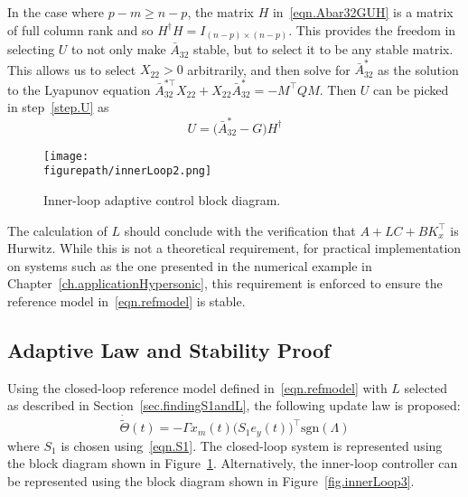 \begin{rem-dan}\label{rem.pmgeqnp}
  In the case where $p-m\geq n-p$, the matrix $H$ in\ \eqref{eqn.Abar32GUH} is a matrix of full column rank and so $H^{\dagger}H=I_{(n-p)\times(n-p)}$.
  This provides the freedom in selecting $U$ to not only make $\bar{A}_{32}$ stable, but to select it to be any stable matrix.
  This allows us to select $X_{22}>0$ arbitrarily, and then solve for $\bar{A}_{32}^{*}$ as the solution to the Lyapunov equation $\bar{A}_{32}^{*\top}X_{22}+X_{22}\bar{A}_{32}^{*}=-M^{\top}QM$.
  Then $U$ can be picked in step~\ref{step.U} as
  \begin{equation}
    \label{eqn.Uremark}
    U=\bigr(\bar{A}_{32}^{*}-G\bigr)H^{\dagger}
  \end{equation}
\end{rem-dan}

\begin{figure}[H]
  \begin{center}
    \texttt{[image: \\figurepath/innerLoop2.png]}
    \vspace{-0.1in}
    \caption{Inner-loop adaptive control block diagram.\label{fig.innerLoop2}}
  \end{center}
\end{figure}

\begin{rem-dan}
  The calculation of $L$ should conclude with the verification that $A+LC+BK_{x}^{\top}$ is Hurwitz.
  While this is not a theoretical requirement, for practical implementation on systems such as the one presented in the numerical example in Chapter~\ref{ch.applicationHypersonic}, this requirement is enforced to ensure the reference model in\ \eqref{eqn.refmodel} is stable.
\end{rem-dan}

\subsection{Adaptive Law and Stability Proof}\label{sec.adaptivelaw}

Using the closed-loop reference model defined in\ \eqref{eqn.refmodel} with $L$ selected as described in Section~\ref{sec.findingS1andL}, the following update law is proposed:
\begin{equation}
  \label{eqn.updatelaw}
  \dot{\widetilde{\Theta}}(t) = -\Gamma x_{m}(t)\bigr(S_{1}e_{y}(t)\bigr)^{\top}\text{sgn}(\Lambda)
\end{equation}
where $S_{1}$ is chosen using\ \eqref{eqn.S1}.
The closed-loop system is represented using the block diagram shown in Figure~\ref{fig.innerLoop2}.
Alternatively, the inner-loop controller can be represented using the block diagram shown in Figure~\ref{fig.innerLoop3}.

